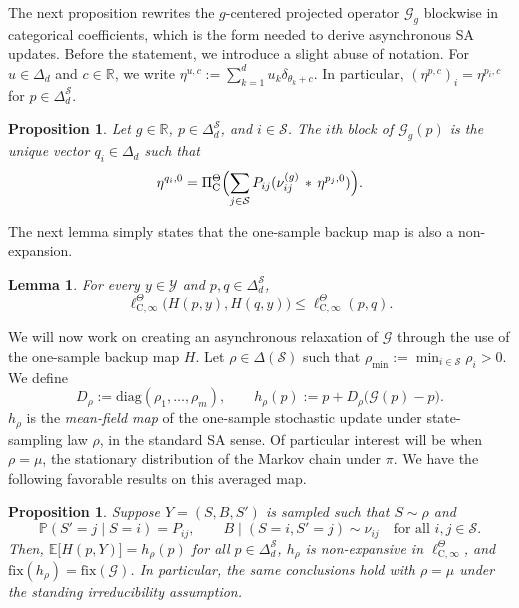 \documentclass{article}
\newtheorem{proposition}[theorem]{Proposition}
\newtheorem{lemma}[theorem]{Lemma}
\newcommand{\X}{\mathcal{S}}
\newcommand{\R}{\mathbb{R}}
\newcommand{\E}{\mathbb{E}}
\begin{document}
The next proposition rewrites the $g$-centered projected operator $\mathcal G_g$ blockwise in categorical coefficients, which is the form needed to derive asynchronous SA updates. Before the statement, we introduce a slight abuse of notation. For $u \in \Delta_d$ and $c \in \R$, we write $
\eta^{u, c} := \sum_{k=1}^d u_k \delta_{\theta_k +c}$.
In particular, $(\eta^{p, c})_i = \eta^{p_i, c}$ for $p \in \Delta^\X_d$.
\begin{proposition}\label{prop:g-block-form}
Let $g \in \R$, $p \in \Delta^\X_d$, and $i \in \X$. The $i$th block of $\mathcal G_g(p)$ is the unique vector $q_i \in \Delta_d$ such that
\begin{equation}
\eta^{q_i, 0} = \Pi^\Theta_{\mathrm C}\Bigl(\sum_{j \in \X} P_{ij}(\nu_{ij}^{(g)} \,\ast\, \eta^{p_j, 0})\Bigr).
\end{equation}
\end{proposition}
The next lemma simply states that the one-sample backup map is also a non-expansion. 
\begin{lemma}\label{lem:one-sample-nonexp}
For every $y \in \mathcal Y$ and $p, q \in \Delta^\X_d$,
\begin{equation}
\ell^\Theta_{\mathrm C, \infty}\bigl( H(p, y), H(q, y)\bigr) \le \ell^\Theta_{\mathrm C, \infty}(p, q).
\end{equation}
\end{lemma}

We will now work on creating an asynchronous relaxation of $\mathcal G$ through the use of the one-sample backup map $H$. Let $\rho \in \Delta(\X)$ such that $\rho_{\min}:=\min_{i \in \X} \rho_i >0$. We define
\begin{equation}
D_\rho := \mathrm{diag}(\rho_1, \dots, \rho_m),\qquad h_\rho(p):= p + D_\rho\bigl(\mathcal G(p) - p\bigr).
\end{equation}
$h_\rho$ is the \emph{mean-field map} of the one-sample stochastic update under state-sampling law $\rho$, in the standard SA sense. Of particular interest will be when $\rho=\mu$, the stationary distribution of the Markov chain under $\pi$. We have the following favorable results on this averaged map.

\begin{proposition}\label{prop:mean-field-fix}
Suppose $Y = (S, B, S')$ is sampled such that $S \sim \rho$ and
\begin{equation}
\mathbb P(S'= j \mid S = i) = P_{ij}, \qquad B \mid (S=i, S'=j) \sim \nu_{ij}\quad \text{for all } i, j \in \X.
\end{equation}
Then, $\E\bigl[H(p, Y)\bigr] = h_\rho(p)$ for all $p \in \Delta^\X_d$, $h_\rho$ is non-expansive in $\ell^\Theta_{\mathrm C, \infty}$, and $\mathrm{fix}(h_\rho) = \mathrm{fix}(\mathcal G)$. In particular, the same conclusions hold with $\rho = \mu$ under the standing irreducibility assumption.
\end{proposition}
\end{document}

